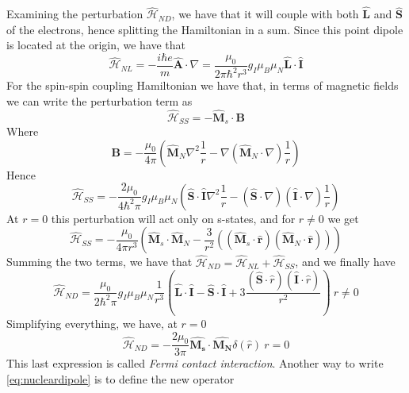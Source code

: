 \documentclass[a4paper, 11pt]{book}
\renewcommand{\vec}[1]{\mathbf{#1}}
\newcommand{\1}{\opr{\mathds{1}}}
\newcommand{\ham}{\mathcal{H}}
\newcommand{\opr}[1]{\hat{#1}}
\newcommand{\vecopr}[1]{\opr{\vec{#1}}}
\theoremstyle{plain}
\begin{document}
	Examining the perturbation $\opr{\ham}_{ND}$, we have that it will couple with both $\vecopr{L}$ and $\vecopr{S}$ of the electrons, hence splitting the Hamiltonian in a sum. Since this point dipole is located at the origin, we have that
	\begin{equation}
		\opr{\ham}_{NL}=-\frac{i\hbar e}{m}\vecopr{A}\cdot\nabla=\frac{\mu_0}{2\pi\hbar^2r^3}g_I\mu_B\mu_N\vecopr{L}\cdot\vecopr{I}
	\end{equation}
	For the spin-spin coupling Hamiltonian we have that, in terms of magnetic fields we can write the perturbation term as
	\begin{equation}
		\opr{\ham}_{SS}=-\vecopr{M}_s\cdot\vec{B}
		\label{eq:spinspinham}
	\end{equation}
	Where
	\begin{equation}
		\vec{B}=-\frac{\mu_0}{4\pi}\left( \vecopr{M}_N\nabla^2\frac{1}{r}-\nabla(\vecopr{M}_N\cdot\nabla)\frac{1}{r} \right)
		\label{eq:magneticdipolenucleus}
	\end{equation}
	Hence
	\begin{equation}
		\opr{\ham}_{SS}=-\frac{2\mu_0}{4\hbar^2\pi}g_I\mu_B\mu_N\left( \vecopr{S}\cdot\vecopr{I}\nabla^2\frac{1}{r}-(\vecopr{S}\cdot\nabla)(\vecopr{I}\cdot\nabla)\frac{1}{r} \right)
		\label{eq:spinspincoupling}
	\end{equation}
	At $r=0$ this perturbation will act only on s-states, and for $r\ne0$ we get
	\begin{equation*}
		\opr{\ham}_{SS}=-\frac{\mu_0}{4\pi r^3}\left( \vecopr{M}_s\cdot\vecopr{M}_N-\frac{3}{r^2}\left( (\vecopr{M}_s\cdot\vecopr{r})(\vecopr{M}_N\cdot\vecopr{r}) \right) \right)
	\end{equation*}
	Summing the two terms, we have that $\opr{\ham}_{ND}=\opr{\ham}_{NL}+\opr{\ham}_{SS}$, and we finally have
	\begin{equation}
		\opr{\ham}_{ND}=\frac{\mu_0}{2\hbar^2\pi}g_I\mu_B\mu_N\frac{1}{r^3}\left( \vecopr{L}\cdot\vecopr{I}-\vecopr{S}\cdot\vecopr{I}+3\frac{(\vecopr{S}\cdot\opr{r})(\vecopr{I}\cdot\opr{r})}{r^2} \right)\ r\ne0
		\label{eq:nucleardipole}
	\end{equation}
	Simplifying everything, we have, at $r=0$
	\begin{equation}
		\opr{\ham}_{ND}=-\frac{2\mu_0}{3\pi}\vecopr{M_s}\cdot\vecopr{M_N}\delta(\opr{r})\ r=0
		\label{eq:centernucleardipole}
	\end{equation}
	This last expression is called \textit{Fermi contact interaction}. Another way to write \eqref{eq:nucleardipole} is to define the new operator
\end{document}
